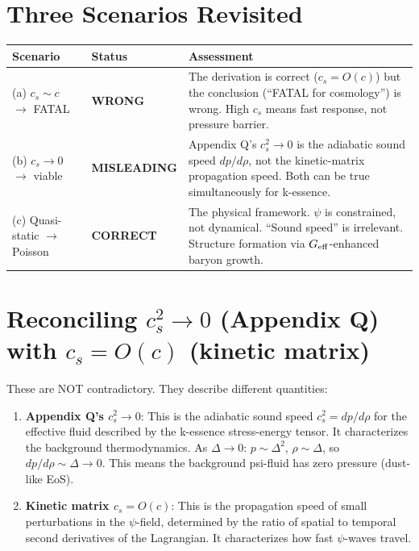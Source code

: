 \documentclass[11pt]{article}
\begin{document}
\section{Three Scenarios Revisited}

\begin{center}
\begin{tabular}{llp{7cm}}
\toprule
Scenario & Status & Assessment \\
\midrule
(a) $c_s \sim c$ $\to$ FATAL & \textbf{WRONG} &
  The derivation is correct ($c_s = O(c)$) but the conclusion
  (``FATAL for cosmology'') is wrong. High $c_s$ means fast
  response, not pressure barrier. \\
(b) $c_s \to 0$ $\to$ viable & \textbf{MISLEADING} &
  Appendix Q's $c_s^2 \to 0$ is the adiabatic sound speed
  $dp/d\rho$, not the kinetic-matrix propagation speed. Both can
  be true simultaneously for k-essence. \\
(c) Quasi-static $\to$ Poisson & \textbf{CORRECT} &
  The physical framework. $\psi$ is constrained, not dynamical.
  ``Sound speed'' is irrelevant. Structure formation via
  $G_{\rm eff}$-enhanced baryon growth. \\
\bottomrule
\end{tabular}
\end{center}

\section{Reconciling $c_s^2 \to 0$ (Appendix Q) with $c_s = O(c)$ (kinetic matrix)}

These are NOT contradictory. They describe different quantities:

\begin{enumerate}[nosep]
\item \textbf{Appendix Q's $c_s^2 \to 0$}: This is the adiabatic sound
  speed $c_s^2 = dp/d\rho$ for the effective fluid described by the
  k-essence stress-energy tensor. It characterizes the background
  thermodynamics. As $\Delta \to 0$: $p \sim \Delta^2$, $\rho \sim \Delta$,
  so $dp/d\rho \sim \Delta \to 0$. This means the background psi-fluid
  has zero pressure (dust-like EoS).

\item \textbf{Kinetic matrix $c_s = O(c)$}: This is the propagation
  speed of small perturbations in the $\psi$-field, determined by the
  ratio of spatial to temporal second derivatives of the Lagrangian.
  It characterizes how fast $\psi$-waves travel.
\end{enumerate}
\end{document}
